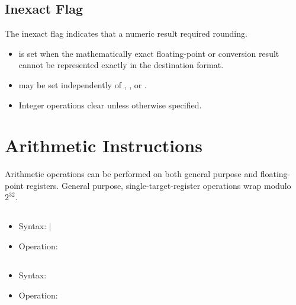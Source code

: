 \subsection{Inexact Flag}

The inexact flag  indicates that a numeric result required rounding.

\begin{itemize}
\item {} is set when the mathematically exact floating-point or conversion
result cannot be represented exactly in the destination format.
\item {} may be set independently of , , or .
\item Integer operations clear  unless otherwise specified.
\end{itemize}

\section{Arithmetic Instructions}

Arithmetic operations can be performed on both general purpose and
floating-point registers. General purpose, single-target-register operations
wrap modulo \(2^{32}\).

\subsection{}

\begin{itemize}
\item Syntax:  | 
\item Operation: 
\end{itemize}

\subsection{}

\begin{itemize}
\item Syntax: 
\item Operation: 
\end{itemize}

\subsection{}

